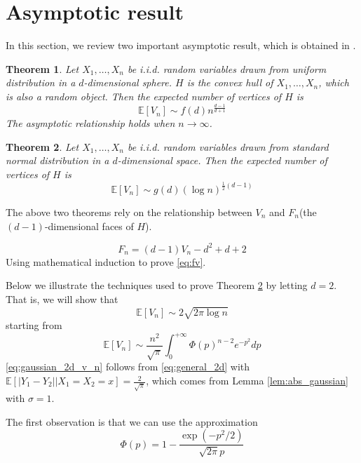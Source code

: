 \documentclass{article}
\newtheorem{theorem}{Theorem}
\def\E{\mathbb{E}}
\begin{document}
\section{Asymptotic result}
In this section, we review two important asymptotic result,
which is obtained in \cite{raynaud1970enveloppe}.
\begin{theorem}
    Let $X_1, \dots, X_n$ be i.i.d. random variables
    drawn from uniform distribution in a $d$-dimensional sphere.
    $H$ is the convex hull of $X_1, \dots, X_n$, which is also
    a random object.
    Then the expected number of vertices of $H$ is
    \begin{equation}
    \E[V_n] \sim f(d)n^{\frac{d-1}{d+1}}
    \end{equation}
    The asymptotic relationship holds when $n\to \infty$.
\end{theorem}
\begin{theorem}\label{thm:x1xnvn}
    Let $X_1, \dots, X_n$ be i.i.d. random variables
    drawn from standard normal distribution in a $d$-dimensional space.
    Then the expected number of vertices of $H$ is
    \begin{equation}
    \E[V_n] \sim g(d) (\log n)^{\frac{1}{2}(d-1)}
    \end{equation}
\end{theorem}
The above two theorems rely on the relationship between
$V_n$ and $F_n$(the $(d-1)$-dimensional faces of $H$).

\begin{equation}\label{eq:fv}
    F_n = (d-1) V_n - d^2 + d + 2
\end{equation}
Using mathematical induction to prove
\eqref{eq:fv}.

Below we illustrate the techniques used to prove Theorem
\ref{thm:x1xnvn} by letting $d=2$.
That is, we will show that
\begin{equation}\label{eq:gaussian_2d_evn}
    \E[V_n] \sim 2\sqrt{2\pi \log n}
\end{equation}
starting from
\begin{equation}\label{eq:gaussian_2d_v_n}
    \E[V_n] \sim \frac{n^2}{\sqrt{\pi}}
    \int_{0}^{+\infty} \Phi(p)^{n-2}e^{-p^2}dp
\end{equation}
\eqref{eq:gaussian_2d_v_n} follows
from \eqref{eq:general_2d} with
$\E[|Y_1-Y_2| \Big\vert X_1=X_2=x] = \frac{2}{\sqrt{\pi}}$,
which comes from Lemma \ref{lem:abs_gaussian} with $\sigma=1$.

The first observation is that we can use the approximation
\begin{equation}\label{eq:gaussian_marginal}
    \Phi(p) = 1-\frac{\exp(-p^2/2)}{\sqrt{2\pi} p}
\end{equation}
\end{document}
